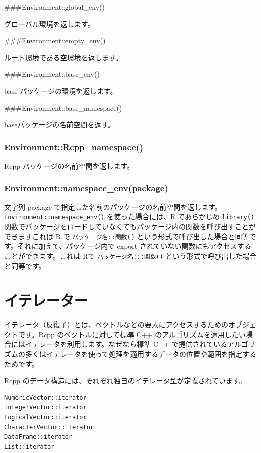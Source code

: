 \documentclass[]{book}
\begin{document}
\#\#\#Environment::global\_env()

グローバル環境を返します。

\#\#\#Environment::empty\_env()

ルート環境である空環境を返します。

\#\#\#Environment::base\_env()

base パッケージの環境を返します。

\#\#\#Environment::base\_namespace()

baseパッケージの名前空間を返す。

\hypertarget{environmentrcpp_namespace}{%
\subsection{Environment::Rcpp\_namespace()}\label{environmentrcpp_namespace}}

Rcpp パッケージの名前空間を返します。

\hypertarget{environmentnamespace_envpackage}{%
\subsection{Environment::namespace\_env(package)}\label{environmentnamespace_envpackage}}

文字列 package で指定した名前のパッケージの名前空間を返します。\texttt{Environment::namespace\_env()} を使った場合には、R であらかじめ \texttt{library()} 関数でパッケージをロードしていなくてもパッケージ内の関数を呼び出すことができますこれは R で \texttt{パッケージ名::関数()} という形式で呼び出した場合と同等です。それに加えて、パッケージ内で export されていない関数にもアクセスすることができます。これは Rで \texttt{パッケージ名:::関数()} という形式で呼び出した場合と同等です。

\chapter{イテレーター}

イテレータ（反復子）とは、ベクトルなどの要素にアクセスするためのオブジェクトです。Rcpp のベクトルに対して標準 C++ のアルゴリズムを適用したい場合にはイテレータを利用します。なぜなら標準 C++ で提供されているアルゴリズムの多くはイテレータを使って処理を適用するデータの位置や範囲を指定するためです。

Rcpp のデータ構造には、それぞれ独自のイテレータ型が定義されています。

\begin{verbatim}
NumericVector::iterator
IntegerVector::iterator
LogicalVector::iterator
CharacterVector::iterator
DataFrame::iterator
List::iterator
\end{verbatim}
\end{document}
